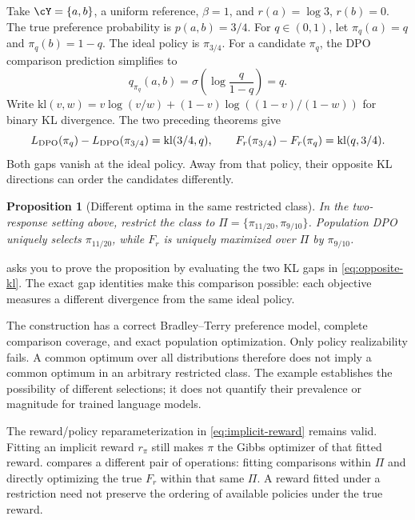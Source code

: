 \documentclass[11pt,twoside]{article}
\newtheorem{proposition}[theorem]{Proposition}
\theoremstyle{definition}
\theoremstyle{remark}
\begin{document}
Take $\cY=\{a,b\}$, a uniform reference, $\beta=1$, and
$r(a)=\log3$, $r(b)=0$. The true preference probability is $p(a,b)=3/4$.
For $q\in(0,1)$, let $\pi_q(a)=q$ and $\pi_q(b)=1-q$. The ideal
policy is $\pi_{3/4}$. For a candidate $\pi_q$, the DPO comparison
prediction simplifies to
\begin{equation}
 q_{\pi_q}(a,b)=\sigma\!\left(\log\frac{q}{1-q}\right)=q.
 \label{eq:binary-dpo}
\end{equation}
Write $\mathrm{kl}(v,w)=v\log(v/w)+(1-v)\log((1-v)/(1-w))$ for
binary KL divergence. The two preceding theorems give
\begin{equation}
 L_{\rm DPO}(\pi_q)-L_{\rm DPO}(\pi_{3/4})=\mathrm{kl}(3/4,q),
 \qquad
 F_r(\pi_{3/4})-F_r(\pi_q)=\mathrm{kl}(q,3/4).
 \label{eq:opposite-kl}
\end{equation}
Both gaps vanish at the ideal policy. Away from that policy, their
opposite KL directions can order the candidates differently.

\begin{proposition}[Different optima in the same restricted class]
\label{prop:restricted}
In the two-response setting above, restrict the class to
$\Pi=\{\pi_{11/20},\pi_{9/10}\}$. Population DPO uniquely selects
$\pi_{11/20}$, while $F_r$ is uniquely maximized over $\Pi$ by
$\pi_{9/10}$.
\end{proposition}

 asks you to prove the proposition by
evaluating the two KL gaps in \cref{eq:opposite-kl}. The exact gap
identities make this comparison possible: each objective measures a
different divergence from the same ideal policy.

The construction has a correct Bradley--Terry preference model, complete comparison
coverage, and exact population optimization. Only policy realizability
fails. A common optimum over all distributions therefore does not imply
a common optimum in an arbitrary restricted class. The example establishes
the possibility of different selections; it does not quantify their
prevalence or magnitude for trained language models.

The reward/policy reparameterization in \cref{eq:implicit-reward} remains
valid. Fitting an implicit reward $r_\pi$ still makes $\pi$ the Gibbs
optimizer of that fitted reward.  compares a different
pair of operations: fitting comparisons within $\Pi$ and directly optimizing
the true $F_r$ within that same $\Pi$. A reward fitted under a restriction
need not preserve the ordering of available policies under the true reward.
\end{document}
